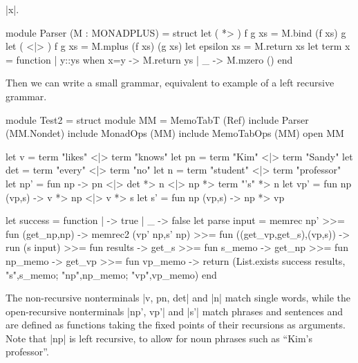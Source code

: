 |x|.
\begin{ocaml}
	module Parser (M : MONADPLUS) = struct
		let ( *> ) f g xs = M.bind (f xs) g
		let ( <|> ) f g xs = M.mplus (f xs) (g xs)
		let epsilon xs = M.return xs
		let term x = function | y::ys when x=y -> M.return ys
													 | _ -> M.mzero ()
	end
\end{ocaml}
Then we can write a small grammar, equivalent to  
example of a left recursive grammar.
\vspace{0.5em}
\begin{ocaml}
	module Test2 = struct
		module MM = MemoTabT (Ref)
		include Parser (MM.Nondet)
		include MonadOps (MM)
		include MemoTabOps (MM)
		open MM

		let v   = term "likes" <|> term "knows" 
		let pn  = term "Kim" <|> term "Sandy" 
		let det = term "every" <|> term "no" 
		let n   = term "student" <|> term "professor" 
		let np' = fun np -> pn <|> det *> n <|> np *> term "'s" *> n
		let vp' = fun np (vp,s) -> v *> np <|> v *> s
		let s'  = fun np (vp,s) -> np *> vp

		let success = function | {} -> true | _ -> false
		let parse input =
			memrec np' >>= fun (get_np,np) ->
			memrec2 (vp' np,s' np) >>= fun ((get_vp,get_s),(vp,s)) ->
			run (s input) >>= fun results ->
			get_s >>= fun s_memo ->
			get_np >>= fun np_memo ->
			get_vp >>= fun vp_memo ->
			return (List.exists success results, 
						  {"s",s_memo; "np",np_memo; "vp",vp_memo})
	end
\end{ocaml}
The non-recursive nonterminals |v, pn, det| and |n| match single words, while the
open-recursive nonterminals |np', vp'| and |s'| match phrases and sentences and 
are defined as functions taking the fixed points of their recursions as arguments.
Note that |np| is left recursive, to allow for noun phrases such as ``Kim's professor''.

